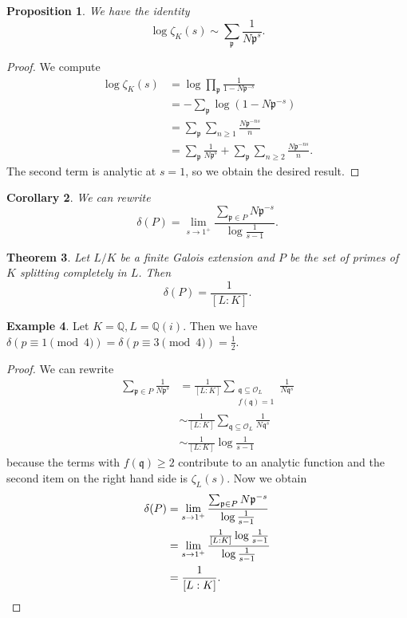 \documentclass[leqno, openany]{memoir}
\newtheorem{thm}{Theorem}[section]
\newtheorem{cor}[thm]{Corollary}
\newtheorem{prop}[thm]{Proposition}
\theoremstyle{definition}
\newtheorem{exm}[thm]{Example}
\theoremstyle{remark}
\theoremstyle{plain}
\theoremstyle{definition}
\theoremstyle{remark}
\newcommand{\Q}{\mathbb{Q}}
\newcommand{\mc}[1]{\mathcal{#1}}
\newcommand{\mf}[1]{\mathfrak{#1}}
\begin{document}
\begin{prop} We have the identity \[ \log \zeta_K(s) \sim \sum_{\mf{p}}
    \frac{1}{N\mf{p}^s}. \] \end{prop} \begin{proof} We compute \begin{align*}
    \log \zeta_K(s) &= \log \prod_{\mf{p}} \frac{1}{1-N\mf{p}^{-s}} \\ &= -
    \sum_{\mf{p}} \log(1-N\mf{p}^{-s}) \\ &= \sum_{\mf{p}} \sum_{n \geq 1}
\frac{N\mf{p}^{-ns}}{n} \\ &= \sum_{\mf{p}} \frac{1}{N\mf{p}^s} + \sum_{\mf{p}}
\sum_{n \geq 2} \frac{N\mf{p}^{-ns}}{n}.  \end{align*} The second term is
analytic at $s=1$, so we obtain the desired result.  \end{proof}

\begin{cor} We can rewrite \[ \delta(P) = \lim_{s \to 1^+}
\frac{\sum_{\mf{p}\in P} N\mf{p}^{-s}}{\log \frac{1}{s-1}}. \] \end{cor}

\begin{thm} Let $L/K$ be a finite Galois extension and $P$ be the set of primes
    of $K$ splitting completely in $L$. Then \[ \delta(P) = \frac{1}{[L:K]}. \]
\end{thm}

\begin{exm} Let $K = \Q, L = \Q(i)$. Then we have $\delta(p \equiv 1 \pmod{4})
= \delta(p \equiv 3 \pmod{4}) = \frac{1}{2}$.  \end{exm}

\begin{proof} We can rewrite \begin{align*} \sum_{\mf{p} \in P}
    \frac{1}{N\mf{p}^s} &= \frac{1}{[L:K]} \sum_{\substack{\mf{q} \subseteq
    \mc{O}_L \\ f(\mf{q}) = 1}} \frac{1}{N\mf{q}^s} \\ &\sim \frac{1}{[L:K]}
    \sum_{\mf{q} \subseteq \mc{O}_L} \frac{1}{N\mf{q}^s} \\ &\sim
\frac{1}{[L:K]} \log \frac{1}{s-1} \end{align*} because the terms with
$f(\mf{q}) \geq 2$ contribute to an analytic function and the second item on
the right hand side is $\zeta_L(s)$. Now we obtain \begin{align*} \delta(P) &=
    \lim_{s \to 1^+} \frac{\sum_{\mf{p} \in P} N\mf{p}^{-s}}{\log
    \frac{1}{s-1}} \\ &= \lim_{s \to 1^+} \frac{\frac{1}{[L:K]} \log
\frac{1}{s-1}}{\log \frac{1}{s-1}} \\ &= \frac{1}{[L:K]}. \qedhere \end{align*}
\end{proof}
\end{document}
